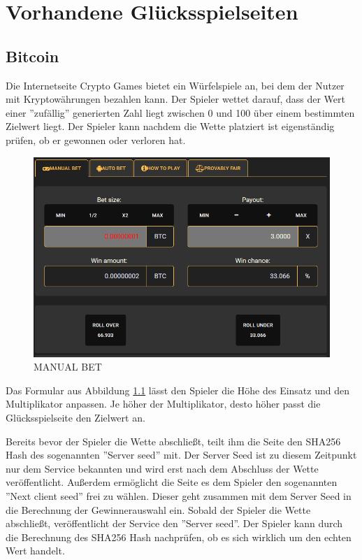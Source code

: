 \chapter{Vorhandene Glücksspielseiten}
\section{Bitcoin}
Die Internetseite Crypto Games \cite{crypto_games} bietet ein Würfelspiele an, bei dem der Nutzer mit Kryptowährungen bezahlen kann. Der Spieler wettet darauf, dass der Wert einer ''zufällig'' generierten Zahl liegt zwischen 0 und 100 über einem bestimmten Zielwert liegt. Der Spieler kann nachdem die Wette platziert ist eigenständig prüfen, ob er gewonnen oder verloren hat.
\begin{figure}[H]
\centering
\includegraphics[scale=0.5]{Figures/crypto_games}
\decoRule
\caption{MANUAL BET}
\label{fig:crypto_games}
\end{figure}

Das Formular aus Abbildung \ref{fig:crypto_games} lässt den Spieler die Höhe des Einsatz und den Multiplikator anpassen. Je höher der Multiplikator, desto höher passt die Glücksspielseite den Zielwert an.

Bereits bevor der Spieler die Wette abschließt, teilt ihm die Seite den SHA256 Hash des sogenannten ''Server seed'' mit. Der Server Seed ist zu diesem Zeitpunkt nur dem Service bekannten und wird erst nach dem Abschluss der Wette veröffentlicht.
Außerdem ermöglicht die Seite es dem Spieler den sogenannten ''Next client seed'' frei zu wählen. Dieser geht zusammen mit dem Server Seed in die Berechnung der Gewinnerauswahl ein. Sobald der Spieler die Wette abschließt, veröffentlicht der Service den ''Server seed''. Der Spieler kann durch die Berechnung des SHA256 Hash nachprüfen, ob es sich wirklich um den echten Wert handelt.

